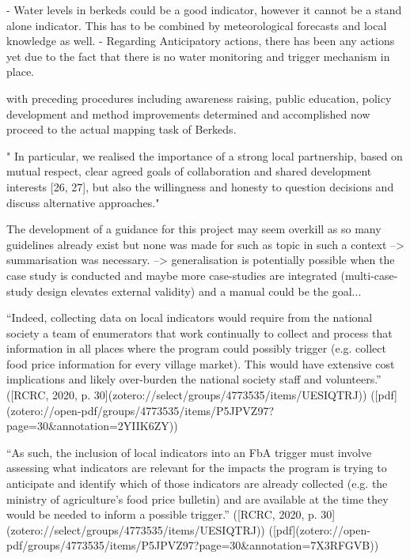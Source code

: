 -	Water levels in berkeds could be a good indicator, however it cannot be a stand alone indicator. This has to be combined by meteorological forecasts and local knowledge as well.
- Regarding Anticipatory actions, there has been any actions yet due to the fact that there is no water monitoring and trigger mechanism in place.



with preceding procedures including awareness raising, public education, policy development and method improvements determined and accomplished now proceed to the actual mapping task of Berkeds.


" In particular, we realised the importance of a strong local partnership, based on mutual respect, clear agreed goals of collaboration and shared development interests [26, 27], but also the willingness and honesty to question decisions and discuss alternative approaches."

The development of a guidance for this project may seem overkill as so many guidelines already exist but none was made for such as topic in such a context --> summarisation was necessary. --> generalisation is potentially possible when the case study is conducted and maybe more case-studies are integrated (multi-case-study design elevates external validity) and a manual could be the goal... 



“Indeed, collecting data on local indicators would require from the national society a team of enumerators that work continually to collect and process that information in all places where the program could possibly trigger (e.g. collect food price information for every village market). This would have extensive cost implications and likely over-burden the national society staff and volunteers.” ([RCRC, 2020, p. 30](zotero://select/groups/4773535/items/UESIQTRJ)) ([pdf](zotero://open-pdf/groups/4773535/items/P5JPVZ97?page=30&annotation=2YIIK6ZY))

“As such, the inclusion of local indicators into an FbA trigger must involve assessing what indicators are relevant for the impacts the program is trying to anticipate and identify which of those indicators are already collected (e.g. the ministry of agriculture's food price bulletin) and are available at the time they would be needed to inform a possible trigger.” ([RCRC, 2020, p. 30](zotero://select/groups/4773535/items/UESIQTRJ)) ([pdf](zotero://open-pdf/groups/4773535/items/P5JPVZ97?page=30&annotation=7X3RFGVB))


